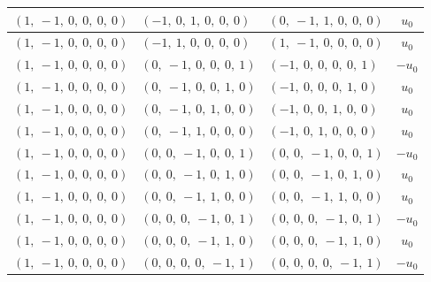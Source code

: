 \documentclass[11pt]{article}
\theoremstyle{definition}
\begin{document}
\begin{longtable}{|l|l|l|c|}
    \hline
    $\left( 1, \  -1, \  0, \  0, \  0, \  0\right)$ & $\left( -1, \  0, \  1, \  0, \  0, \  0\right)$ & $\left( 0, \  -1, \  1, \  0, \  0, \  0\right)$ & $u_{0}$ \\
    \hline
    $\left( 1, \  -1, \  0, \  0, \  0, \  0\right)$ & $\left( -1, \  1, \  0, \  0, \  0, \  0\right)$ & $\left( 1, \  -1, \  0, \  0, \  0, \  0\right)$ & $u_{0}$ \\
    \hline
    $\left( 1, \  -1, \  0, \  0, \  0, \  0\right)$ & $\left( 0, \  -1, \  0, \  0, \  0, \  1\right)$ & $\left( -1, \  0, \  0, \  0, \  0, \  1\right)$ & $- u_{0}$ \\
    \hline
    $\left( 1, \  -1, \  0, \  0, \  0, \  0\right)$ & $\left( 0, \  -1, \  0, \  0, \  1, \  0\right)$ & $\left( -1, \  0, \  0, \  0, \  1, \  0\right)$ & $u_{0}$ \\
    \hline
    $\left( 1, \  -1, \  0, \  0, \  0, \  0\right)$ & $\left( 0, \  -1, \  0, \  1, \  0, \  0\right)$ & $\left( -1, \  0, \  0, \  1, \  0, \  0\right)$ & $u_{0}$ \\
    \hline
    $\left( 1, \  -1, \  0, \  0, \  0, \  0\right)$ & $\left( 0, \  -1, \  1, \  0, \  0, \  0\right)$ & $\left( -1, \  0, \  1, \  0, \  0, \  0\right)$ & $u_{0}$ \\
    \hline
    $\left( 1, \  -1, \  0, \  0, \  0, \  0\right)$ & $\left( 0, \  0, \  -1, \  0, \  0, \  1\right)$ & $\left( 0, \  0, \  -1, \  0, \  0, \  1\right)$ & $- u_{0}$ \\
    \hline
    $\left( 1, \  -1, \  0, \  0, \  0, \  0\right)$ & $\left( 0, \  0, \  -1, \  0, \  1, \  0\right)$ & $\left( 0, \  0, \  -1, \  0, \  1, \  0\right)$ & $u_{0}$ \\
    \hline
    $\left( 1, \  -1, \  0, \  0, \  0, \  0\right)$ & $\left( 0, \  0, \  -1, \  1, \  0, \  0\right)$ & $\left( 0, \  0, \  -1, \  1, \  0, \  0\right)$ & $u_{0}$ \\
    \hline
    $\left( 1, \  -1, \  0, \  0, \  0, \  0\right)$ & $\left( 0, \  0, \  0, \  -1, \  0, \  1\right)$ & $\left( 0, \  0, \  0, \  -1, \  0, \  1\right)$ & $- u_{0}$ \\
    \hline
    $\left( 1, \  -1, \  0, \  0, \  0, \  0\right)$ & $\left( 0, \  0, \  0, \  -1, \  1, \  0\right)$ & $\left( 0, \  0, \  0, \  -1, \  1, \  0\right)$ & $u_{0}$ \\
    \hline
    $\left( 1, \  -1, \  0, \  0, \  0, \  0\right)$ & $\left( 0, \  0, \  0, \  0, \  -1, \  1\right)$ & $\left( 0, \  0, \  0, \  0, \  -1, \  1\right)$ & $- u_{0}$ \\

\end{longtable}
\end{document}
